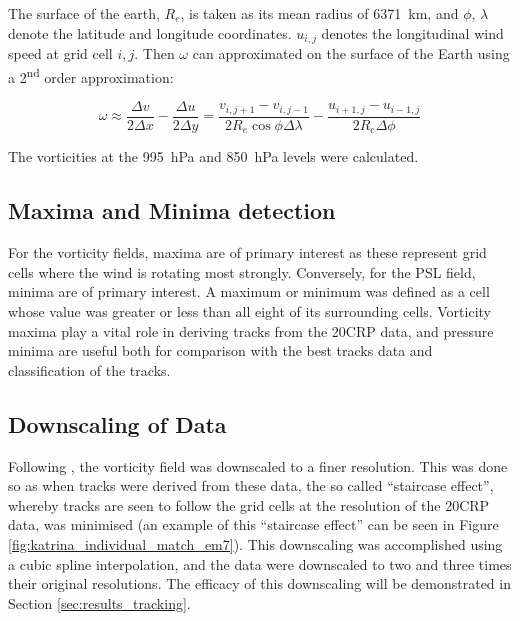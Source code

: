 \documentclass[pdftex,12pt,a4paper]{report}
\newcommand{\ts}{\textsuperscript}
\begin{document}
The surface of the earth, $R_e$, is taken as its mean radius of \SI{6371}{km}, and $\phi$, $\lambda$
denote the latitude and longitude coordinates. $u_{i, j}$ denotes the longitudinal wind speed at
grid cell $i, j$. Then $\omega$ can approximated on the surface of the Earth using a 2\ts{nd} order
approximation: %


\begin{equation}
    \omega \approx \frac{\Delta v}{2 \Delta x} - \frac{\Delta u}{2 \Delta y} = \frac{v_{i,j+1} - v_{i,j-1}}{2 R_e \cos{\phi} \Delta \lambda} - \frac{u_{i+1,j} - u_{i-1,j}}{2 R_e \Delta \phi }
    \label{eqn:vorticity_2nd_order}
\end{equation}

The vorticities at the \SI{995}{hPa} and \SI{850}{hPa} levels were calculated.

\subsection{Maxima and Minima detection}
\label{sec:methods_maxima_minima}

For the vorticity fields, maxima are of primary interest as these represent grid cells where the
wind is rotating most strongly. Conversely, for the PSL field, minima are of primary interest. A
maximum or minimum was defined as a cell whose value was greater or less than all eight of its
surrounding cells. Vorticity maxima play a vital role in deriving tracks from the 20CRP data, and
pressure minima are useful both for comparison with the best tracks data and classification of the
tracks.

\subsection{Downscaling of Data}

Following \textcite{TODOCITEhodgesXXX}, the vorticity field was downscaled to a finer resolution. This was
done so as when tracks were derived from these data, the so called ``staircase effect'', whereby
tracks are seen to follow the grid cells at the resolution of the 20CRP data, was minimised (an
example of this ``staircase effect'' can be seen in Figure \ref{fig:katrina_individual_match_em7}). This
downscaling was accomplished using a cubic spline interpolation, and the data were downscaled to two and
three times their original resolutions. The efficacy of this downscaling will be demonstrated in
Section \ref{sec:results_tracking}.
\end{document}
